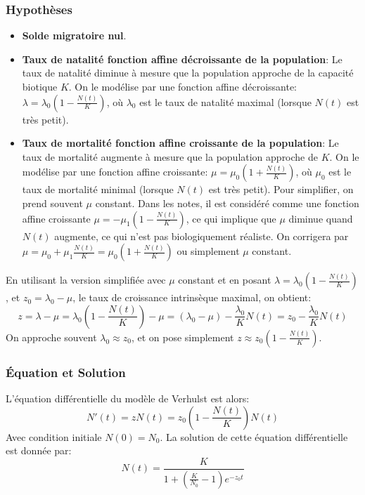 \documentclass[oneside]{book}
\begin{document}
\subsubsection{Hypothèses}

\begin{itemize}
    \item \textbf{Solde migratoire nul}.
    \item \textbf{Taux de natalité fonction affine décroissante de la population}: Le taux de natalité diminue à mesure que la population approche de la capacité biotique $K$. On le modélise par une fonction affine décroissante: $\lambda = \lambda_0 (1 - \frac{N(t)}{K})$, où $\lambda_0$ est le taux de natalité maximal (lorsque $N(t)$ est très petit).
    \item \textbf{Taux de mortalité fonction affine croissante de la population}: Le taux de mortalité augmente à mesure que la population approche de $K$. On le modélise par une fonction affine croissante: $\mu = \mu_0 (1 + \frac{N(t)}{K})$, où $\mu_0$ est le taux de mortalité minimal (lorsque $N(t)$ est très petit). Pour simplifier, on prend souvent $\mu$ constant. Dans les notes, il est considéré comme une fonction affine croissante $\mu = -\mu_1 (1 - \frac{N(t)}{K})$, ce qui implique que $\mu$ diminue quand $N(t)$ augmente, ce qui n'est pas biologiquement réaliste. On corrigera par $\mu = \mu_0 + \mu_1 \frac{N(t)}{K} = \mu_0 (1 + \frac{N(t)}{K})$ ou simplement $\mu$ constant.
\end{itemize}
En utilisant la version simplifiée avec $\mu$ constant et en posant $\lambda = \lambda_0 (1 - \frac{N(t)}{K})$, et $z_0 = \lambda_0 - \mu$, le taux de croissance intrinsèque maximal, on obtient:
\[
z = \lambda - \mu = \lambda_0 (1 - \frac{N(t)}{K}) - \mu = (\lambda_0 - \mu) - \frac{\lambda_0}{K} N(t) = z_0 - \frac{\lambda_0}{K} N(t)
\]
On approche souvent $\lambda_0 \approx z_0$, et on pose simplement $z \approx z_0 (1 - \frac{N(t)}{K})$.

\subsubsection{Équation et Solution}
\begin{proposition}
L'équation différentielle du modèle de Verhulst est alors:
\[
N'(t) = z N(t) = z_0 \left(1 - \frac{N(t)}{K}\right) N(t)
\]
Avec condition initiale $N(0) = N_0$. La solution de cette équation différentielle est donnée par:
\[
N(t) = \frac{K}{1 + \left(\frac{K}{N_0} - 1\right) e^{-z_0 t}}
\]
\end{proposition}
\end{document}
